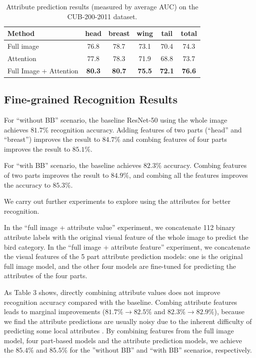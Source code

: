 \documentclass{article}
\begin{document}
\begin{table}[tbh!]
\begin{small}
\begin{center}
\caption{Attribute prediction results (measured by average AUC) on the CUB-200-2011 dataset.}
\begin{tabular}
{l||c|c|c|c|c}\hline
Method & head & breast & wing & tail & total\\\hline
Full image & 76.8 & 78.7 & 73.1 & 70.4 &  74.3 \\
Attention  & 77.8 &  78.3 & 71.9 & 68.8 & 73.7 \\
Full Image + Attention & \bf{80.3} &  \bf{80.7} & \bf{75.5} & \bf{72.1} & \bf{76.6} \\\hline
\end{tabular}
\end{center}
\end{small}
\end{table}

\subsection{Fine-grained Recognition Results}
For ``without BB'' scenario, the baseline ResNet-50 using the whole image achieves $81.7\%$ recognition accuracy.
Adding features of two parts (``head'' and ``breast'') improves the result to $84.7\%$ and combing features of four parts improves the result to $85.1\%$.

For ``with BB'' scenario, the baseline achieves $82.3\%$ accuracy.
Combing features of two parts improves the result to $84.9\%$, and combing all the features improves the accuracy to $85.3\%$.

We carry out further experiments to explore using the attributes for better recognition.

In the ``full image + attribute value'' experiment, we concatenate 112 binary attribute labels with the original visual  feature of the whole image to predict the bird category.
In the ``full image + attribute feature'' experiment, we concatenate the visual features of the 5 part attribute prediction models:
one is the original full image model, and the other four models are fine-tuned for predicting the attributes of the four parts.

As Table 3 shows, directly combining attribute values does not improve recognition accuracy compared with the baseline.
Combing attribute features leads to marginal improvements ($81.7\% \to 82.5\%$ and $82.3\% \to 82.9\%$), because we find the attribute predictions are usually noisy due to the inherent difficulty of predicting some local attributes .
By combining features from the full image model, four part-based models and the attribute prediction models, we achieve the $85.4\%$ and $85.5\%$ for the ''without BB'' and ``with BB'' scenarios, respectively.
\end{document}
